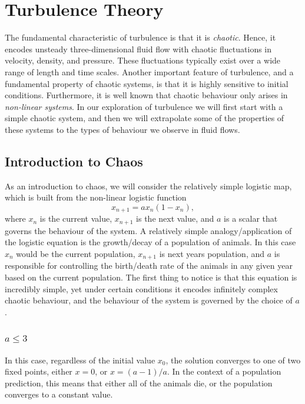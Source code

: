 \section{Turbulence Theory}
The fundamental characteristic of turbulence is that it is {\it chaotic}. Hence, it encodes unsteady three-dimensional fluid flow with chaotic fluctuations in velocity, density, and pressure. These fluctuations typically exist over a wide range of length and time scales. Another important feature of turbulence, and a fundamental property of chaotic systems, is that it is highly sensitive to initial conditions. Furthermore, it is well known that chaotic behaviour only arises in {\it non-linear systems}. In our exploration of turbulence we will first start with a simple chaotic system, and then we will extrapolate some of the properties of these systems to the types of behaviour we observe in fluid flows.

\subsection{Introduction to Chaos}
As an introduction to chaos, we will consider the relatively simple logistic map, which is built from the non-linear logistic function~\cite{}
\begin{equation}
	x_{n+1} = ax_n(1-x_n),
	\label{eq:logistic_function}
\end{equation}
where $x_n$ is the current value, $x_{n+1}$ is the next value, and $a$ is a scalar that governs the behaviour of the system. A relatively simple analogy/application of the logistic equation is the growth/decay of a population of animals. In this case $x_n$ would be the current population, $x_{n+1}$ is next years population, and $a$ is responsible for controlling the birth/death rate of the animals in any given year based on the current population. The first thing to notice is that this equation is incredibly simple, yet under certain conditions it encodes infinitely complex chaotic behaviour, and the behaviour of the system is governed by the choice of $a$.

\subsubsection{$a\leq 3$}
In this case, regardless of the initial value $x_0$, the solution converges to one of two fixed points, either $x=0$, or $x=(a-1)/a$. In the context of a population prediction, this means that either all of the animals die, or the population converges to a constant value.

